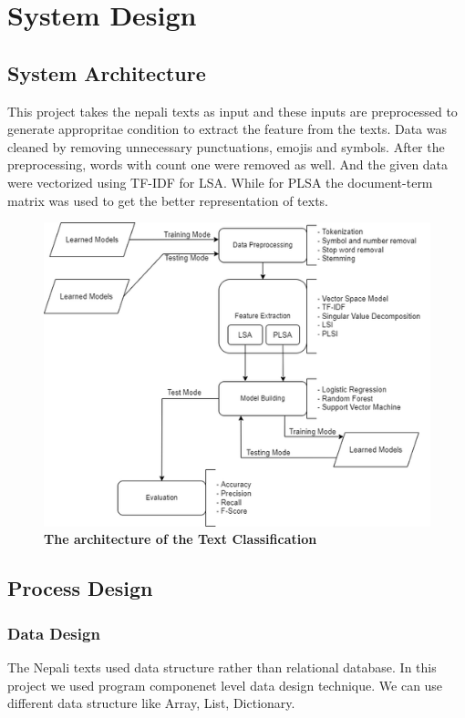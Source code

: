 \documentclass[12pt]{report}
\begin{document}
        \newpage
        \chapter{System Design}
        \section{System Architecture}
                This project takes the nepali texts as input and these inputs are preprocessed to generate appropritae condition to extract 
                the feature from the texts.
                Data was cleaned by removing unnecessary punctuations, emojis and symbols. After the preprocessing, words with count one were removed as well. And the given data were vectorized using TF-IDF for LSA.
                While for PLSA the document-term matrix was used to get the better representation of texts.

                \begin{figure}[h!]
                        \centering
                        \includegraphics[scale=0.8]{system_architeture.png}
                        \caption{\textbf{The architecture of the Text Classification}}
                   
                \end{figure}
        \section{Process Design}
        \subsection{Data Design}
        The Nepali texts used data structure rather than relational database. In this project we used program componenet level data design technique. We can use
        different data structure like Array, List, Dictionary.
\end{document}
